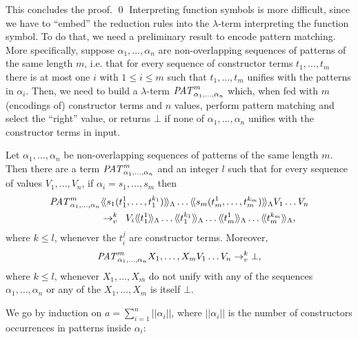 \documentclass{LMCS}
\newcommand{\patone}{s}
\newcommand{\seqpone}{\alpha}
\newcommand{\valueone}{V}
\newcommand{\termone}{t}
\newcommand{\cltermone}{X}
\newcommand{\TRSonetolambdaI}[1]{\langle\!\langle #1\rangle\!\rangle_{\Lambdaterms}}
\newcommand{\errorterm}{\bot}
\newcommand{\dsize}[1]{||#1||}
\newcommand{\Lambdaterms}{\Lambda}
\newcommand{\rewrlambdav}{\rightarrow_v}
\newcounter{number}
\begin{document}
This concludes the proof.
\qed
Interpreting function symbols is more difficult, since we have to ``embed'' the reduction rules
into the $\lambda$-term interpreting the function symbol. To do that, we need a preliminary
result to encode pattern matching. More specifically, suppose $\seqpone_1,\ldots,\seqpone_n$ are
non-overlapping sequences of patterns of the same length $m$, i.e. that for every
sequence of constructor terms $\termone_1,\ldots,\termone_m$ there is at most one $i$ with
$1\leq i\leq m$ such that $\termone_1,\ldots,\termone_m$ unifies with the patterns
in $\seqpone_i$. Then, we need to build a $\lambda$-term 
$\patlambda_{\seqpone_1,\ldots,\seqpone_n}^m$ which, when fed with $m$ (encodings of) constructor
terms and $n$ values, perform pattern matching and select the ``right'' value, or returns
$\errorterm$ if none of $\seqpone_1,\ldots,\seqpone_n$ unifies with the constructor terms
in input. 
\begin{lem}\label{lemma:pm}
Let $\seqpone_1,\ldots,\seqpone_n$ be non-overlapping sequences of patterns of the same length $m$.
Then there are a term $\patlambda_{\seqpone_1,\ldots,\seqpone_n}^m$ and an integer $l$ such that
for every sequence of values $\valueone_1,\ldots,\valueone_n$,
if $\seqpone_i=\patone_1,\ldots,\patone_m$ then
\begin{equation*}
\begin{split}
\patlambda_{\seqpone_1,\ldots,\seqpone_n}^m &
  \TRSonetolambdaI{\patone_1(\termone_1^1,\ldots,\termone_1^{k_1})}
  \ldots
  \TRSonetolambdaI{\patone_m(\termone_m^1,\ldots,\termone_m^{k_m})}
   \valueone_1\ldots \valueone_n\\
&\rewrlambdav^k \; \;
\valueone_i\TRSonetolambdaI{\termone_1^1}\ldots\TRSonetolambdaI{\termone_1^{k_1}}
\ldots\TRSonetolambdaI{\termone_m^1}\ldots\TRSonetolambdaI{\termone_m^{k_m}},
\end{split}
\end{equation*}
where $k\leq l$, whenever the $\termone_i^j$ are constructor terms. Moreover,
$$
\patlambda_{\seqpone_1,\ldots,\seqpone_n}^m\cltermone_1,\ldots,\cltermone_mV_1\ldots V_n
\rewrlambdav^k \errorterm,
$$
where $k\leq l$,
whenever $\cltermone_1,\ldots,\cltermone_m$ do not unify with
any of the sequences $\seqpone_1,\ldots,\seqpone_n$ or any of 
the $\cltermone_1,\ldots,\cltermone_m$ is itself $\errorterm$.
\end{lem}
\proof
We go by induction on $a=\sum_{i=1}^n\dsize{\seqpone_i}$, where
$\dsize{\seqpone_i}$ is the number of constructors occurrences in patterns
inside $\seqpone_i$:
\end{document}
